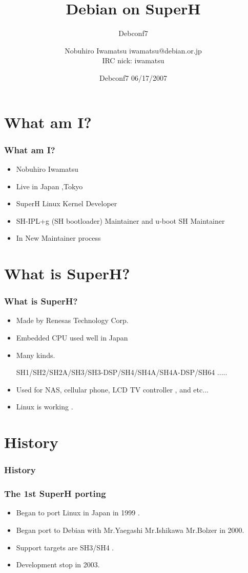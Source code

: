 \documentclass[cjk,dvipdfm,12pt]{beamer}
\title{Debian on SuperH}
\subtitle{Debconf7}
\author{Nobuhiro Iwamatsu iwamatsu@debian.or.jp\\IRC nick: iwamatsu}
\date{Debconf7 06/17/2007}
\begin{document}
\frame{\titlepage{}}

\section{What am I?}

\begin{frame}
 \frametitle{What am I?}
 \begin{itemize}
  \item Nobuhiro Iwamatsu
  \item Live in Japan ,Tokyo
  \item SuperH Linux Kernel Developer
  \item SH-IPL+g (SH bootloader) Maintainer and u-boot SH Maintainer
  \item In New Maintainer process
    
 \end{itemize}
\end{frame}


\section{What is SuperH?}

\begin{frame}
 \frametitle{What is SuperH?}
 \begin{itemize}
  \item Made by Renesas Technology Corp.
  \item Embedded CPU used well in Japan
  \item Many kinds.
  
	SH1/SH2/SH2A/SH3/SH3-DSP/SH4/SH4A/SH4A-DSP/SH64 .....

  \item Used for NAS, cellular phone, LCD TV controller , and etc...
  \item Linux is working .
    
 \end{itemize}
\end{frame}

\section{History}

\begin{frame}
 \frametitle{History}
 
\end{frame}

\begin{frame}
 \frametitle{The 1st SuperH porting}
  \begin{itemize}
    \item Began to port Linux in Japan in 1999 .
    \item Began port to Debian with Mr.Yaegashi Mr.Ishikawa Mr.Bolzer in 2000.
    \item Support targets are SH3/SH4 .
    \item Development stop in 2003. 
  \end{itemize}
\end{frame}
\end{document}
